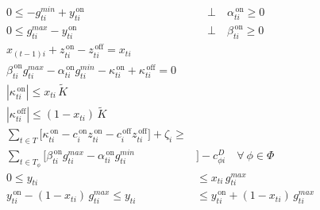 \documentclass[9pt,a4paper]{article}
\newcommand{\on}{^{\,\text{on}}}
\newcommand{\off}{^{\,\text{off}}}
\begin{document}
\begin{subequations}
\begin{align}
	\tag{17a} \\
0 \leq - g^{min}_{ti} + y\on_{ti} &\quad \bot \quad \alpha\on_{ti} \geq 0 
	\tag{17b} \label{example:generator:KKT:min} \\
0 \leq g^{max}_{ti} - y\on_{ti} &\quad \bot \quad \beta\on_{ti} \geq 0 
	\tag{17c} \label{example:generator:KKT:max} \\
x_{(t-1)i} + z\on_{ti} - z\off_{ti} = x_{ti} &
	\tag{21a} \label{example:BNE:generator:intertemporal} \\
\beta\on_{ti} g^{max}_{ti} - \alpha\on_{ti} g^{min}_{ti} - \kappa\on_{ti} + \kappa\off_{ti} =0 &
	\tag{21b} \label{example:BNE:generator:profits} \\
|\kappa\on_{ti}| \leq x_{ti} \, \widetilde{K} &
	\tag{21c} \label{example:BNE:kappa_on} \\
|\kappa\off_{ti}| \leq (1-x_{ti}) \, \widetilde{K} &
	\tag{21d} \label{example:BNE:kappa_off} \\
\sum_{t \in T} \bigg[\kappa\on_{ti}
- c\on_{i} z\on_{ti} -  c\off_{i} z\off_{ti}  \bigg] + \zeta_{i}
\geq & \quad \nonumber \\ 
\sum_{t \in T_\phi} \bigg[\beta\on_{ti} g^{max}_{ti} - \alpha\on_{ti} g^{min}_{ti}& \bigg]
- c^D_{\phi i} 
\quad \forall~\phi \in \Phi 
	\tag{21e}\label{example:BNE:generator:incentive} \\
0 \leq y_{ti} &\leq x_{ti} \, g^{max}_{ti} 
	\tag{21f} \\[2pt]
y\on_{ti} - (1-x_{ti}) \, g^{max}_{ti} \leq y_{ti} &\leq y\on_{ti} + (1-x_{ti}) \, g^{max}_{ti}
	\tag{21g} 
\end{align}
\end{subequations}
\end{document}
